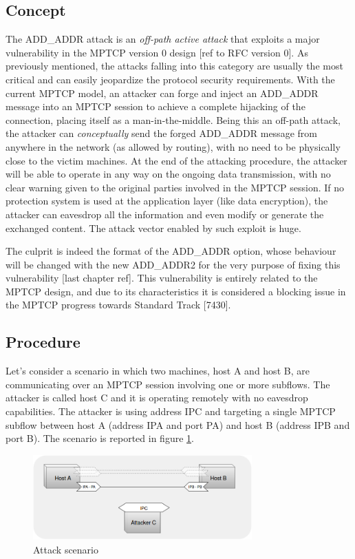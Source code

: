 \subsection{Concept}
The ADD\_ADDR attack is an \textit{off-path active attack} that exploits a major vulnerability in the MPTCP version 0 design [ref to RFC version 0]. As previously mentioned, the attacks falling into this category are usually the most critical and can easily jeopardize the protocol security requirements.
With the current MPTCP model, an attacker can forge and inject an ADD\_ADDR message into an MPTCP session to achieve a complete hijacking of the connection, placing itself as a man-in-the-middle. Being this an off-path attack, the attacker can \textit{conceptually} send the forged ADD\_ADDR message from anywhere in the network (as allowed by routing), with no need to be physically close to the victim machines. At the end of the attacking procedure, the attacker will be able to operate in any way on the ongoing data transmission, with no clear warning given to the original parties involved in the MPTCP session.
If no protection system is used at the application layer (like data encryption), the attacker can eavesdrop all the information and even modify or generate the exchanged content. The attack vector enabled by such exploit is huge.


The culprit is indeed the format of the ADD\_ADDR option, whose behaviour will be changed with the new ADD\_ADDR2 for the very purpose of fixing this vulnerability [last chapter ref].
This vulnerability is entirely related to the MPTCP design, and due to its characteristics it is considered a blocking issue in the MPTCP progress towards Standard Track [7430].

\subsection{Procedure}
Let's consider a scenario in which two machines, host A and host B, are communicating over an MPTCP session involving one or more subflows. The attacker is called host C and it is operating remotely with no eavesdrop capabilities. The attacker is using address IPC and targeting a single MPTCP subflow between host A (address IPA and port PA) and host B (address IPB and port B). The scenario is reported in figure \ref{fig:attack1}.

\begin{figure}[!htb]
\centering
\includegraphics[width=0.75\textwidth]{images/Attack1}
\caption{Attack scenario}
\label{fig:attack1}
\end{figure}

